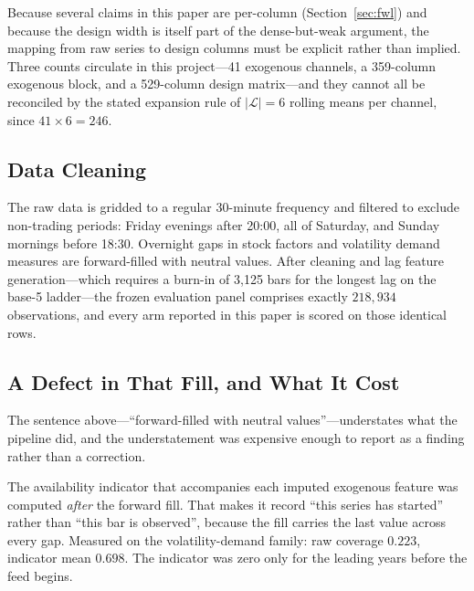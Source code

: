 Because several claims in this paper are per-column
(Section~\ref{sec:fwl}) and because the design width is itself part of the
dense-but-weak argument, the mapping from raw series to design columns must be
explicit rather than implied. Three counts circulate in this project---41
exogenous channels, a 359-column exogenous block, and a 529-column design
matrix---and they cannot all be reconciled by the stated expansion rule of
$|\mathcal{L}| = 6$ rolling means per channel, since $41 \times 6 = 246$.

\subsection{Data Cleaning}
\label{sec:cleaning}

The raw data is gridded to a regular 30-minute frequency and filtered to
exclude non-trading periods: Friday evenings after 20:00, all of Saturday, and
Sunday mornings before 18:30. Overnight gaps in stock factors and volatility
demand measures are forward-filled with neutral values. After cleaning and lag
feature generation---which requires a burn-in of 3{,}125 bars for the longest
lag on the base-5 ladder---the frozen evaluation panel comprises exactly
$218{,}934$ observations, and every arm reported in this paper is scored on
those identical rows.

\subsection{A Defect in That Fill, and What It Cost}
\label{sec:fill_defect}

The sentence above---``forward-filled with neutral values''---understates what
the pipeline did, and the understatement was expensive enough to report as a
finding rather than a correction.

The availability indicator that accompanies each imputed exogenous feature was
computed \emph{after} the forward fill. That makes it record ``this series has
started'' rather than ``this bar is observed'', because the fill carries the
last value across every gap. Measured on the volatility-demand family: raw
coverage $0.223$, indicator mean $0.698$. The indicator was zero only for the
leading years before the feed begins.

